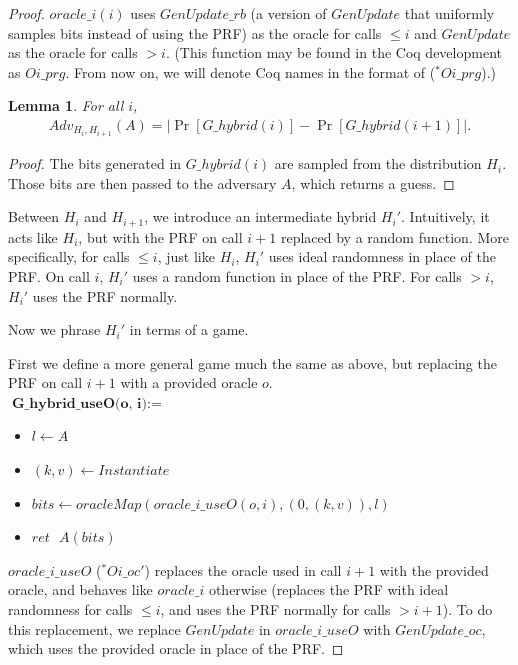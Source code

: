 \documentclass[12pt,lot, lof]{puthesis}
\newenvironment{game}
{ \begin{itemize}[noitemsep,nolistsep] 
}
{ \end{itemize}                  }
\newcommand{\s} {\textrm{ }}
\newcommand{\lar}{\leftarrow}
\newtheorem{lem}{Lemma}[thm]
\begin{document}
{\begin{proof}
$oracle\_i(i)$ uses $GenUpdate\_rb$ (a version of $GenUpdate$ that uniformly samples bits instead of using the PRF) as the oracle for calls $\leq i$ and $GenUpdate$ as the oracle for calls $> i$. (This function may be found in the Coq development as $Oi\_prg$. From now on, we will denote Coq names in the format of ($^*Oi\_prg$).)

\begin{lem}For all $i$, 
\begin{gather*}
Adv_{H_i, H_{i+1}}(A) = |\Pr[G\_hybrid(i)] - \Pr[G\_hybrid(i+1)]|.
\end{gather*}
\end{lem}
\begin{proof} The bits generated in $G\_hybrid(i)$ are sampled from the distribution $H_i$. Those bits are then passed to the adversary $A$, which returns a guess. %
\end{proof}

Between $H_i$ and $H_{i+1}$, we introduce an intermediate hybrid $H_i'$. Intuitively, it acts like $H_i$, but with the PRF on call $i+1$ replaced by a random function. More specifically, for calls $\leq i$, just like $H_i$, $H_i'$ uses ideal randomness in place of the PRF. On call $i$, $H_i'$ uses a random function in place of the PRF. For calls $> i$, $H_i'$ uses the PRF normally.

Now we phrase $H_i'$ in terms of a game.

First we define a more general game much the same as above, but replacing the PRF on call $i+1$ with a provided oracle $o$. \\

$\textbf{G\_hybrid\_useO(o, i)} := $
\begin{game}
\item[] $l \leftarrow A$
\item[] $(k,v) \leftarrow Instantiate$
\item[] $bits \lar oracleMap(oracle\_i\_useO(o, i),(0, (k, v)),l)$
\item[] $ret \s A(bits)$ \\
\end{game}

$oracle\_i\_useO$ ($^*Oi\_oc'$) replaces the oracle used in call $i+1$ with the provided oracle, and behaves like $oracle\_i$ otherwise (replaces the PRF with ideal randomness for calls $\leq i$, and uses the PRF normally for calls $> i+1$). To do this replacement, we replace $GenUpdate$ in $oracle\_i\_useO$ with $GenUpdate\_oc$, which uses the provided oracle in place of the PRF.


\end{proof}}
\end{document}
